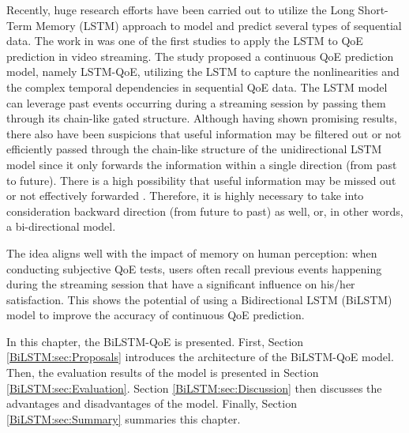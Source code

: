 Recently, huge research efforts have been carried out to utilize the Long Short-Term Memory (LSTM) approach to model and predict several types of sequential data.
The work in \citep{QoEModel_LSTM} was one of the first studies to apply the LSTM to QoE prediction in video streaming.
The study proposed a continuous QoE prediction model, namely LSTM-QoE, utilizing the LSTM to capture the nonlinearities and the complex temporal dependencies in sequential QoE data.
The LSTM model can leverage past events occurring during a streaming session by passing them through its chain-like gated structure.
Although having shown promising results, there also have been suspicions that useful information may be filtered out or not efficiently passed through the chain-like structure of the unidirectional LSTM model since it only forwards the information within a single direction (from past to future).
There is a high possibility that useful information may be missed out or not effectively forwarded \citep{BiLSTM_TrafficSpeed}.
Therefore, it is highly necessary to take into consideration backward direction (from future to past) as well, or, in other words, a bi-directional model.


The idea aligns well with the impact of memory on human perception: when conducting subjective QoE tests, users often recall previous events happening during the streaming session that have a significant influence on his/her satisfaction.
This shows the potential of using a Bidirectional LSTM (BiLSTM) model to improve the accuracy of continuous QoE prediction.


In this chapter, the BiLSTM-QoE is presented.
First, Section \ref{BiLSTM:sec:Proposals} introduces the architecture of the BiLSTM-QoE model.
Then, the evaluation results of the model is presented in Section \ref{BiLSTM:sec:Evaluation}.
Section \ref{BiLSTM:sec:Discussion} then discusses the advantages and disadvantages of the model.
Finally, Section \ref{BiLSTM:sec:Summary} summaries this chapter.